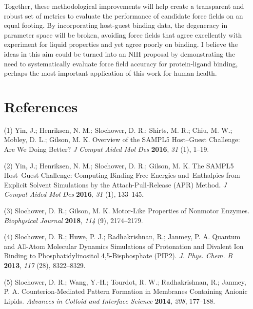 \documentclass[11pt,notitlepage]{article}
\begin{document}
Together, these methodological improvements will help create a
transparent and robust set of metrics to evaluate the performance of
candidate force fields on an equal footing. By incorporating host-guest
binding data, the degeneracy in parameter space will be broken, avoiding
force fields that agree excellently with experiment for liquid
properties and yet agree poorly on binding. I believe the ideas in this
aim could be turned into an NIH proposal by demonstrating the need to
systematically evaluate force field accuracy for protein-ligand binding,
perhaps the most important application of this work for human health.

\pagebreak
\setlength{\parskip}{0.1mm}

\hypertarget{references}{%
\section*{References}\label{references}}


\hypertarget{refs}{}
\leavevmode\hypertarget{ref-BGsUYQln}{}%
(1) Yin, J.; Henriksen, N. M.; Slochower, D. R.; Shirts, M. R.; Chiu, M.
W.; Mobley, D. L.; Gilson, M. K. Overview of the SAMPL5 Host--Guest
Challenge: Are We Doing Better? \emph{J Comput Aided Mol Des}
\textbf{2016}, \emph{31} (1), 1--19.

\leavevmode\hypertarget{ref-uzHaEv9Z}{}%
(2) Yin, J.; Henriksen, N. M.; Slochower, D. R.; Gilson, M. K. The
SAMPL5 Host--Guest Challenge: Computing Binding Free Energies
and~Enthalpies from Explicit Solvent Simulations by the
Attach-Pull-Release (APR) Method. \emph{J Comput Aided Mol Des}
\textbf{2016}, \emph{31} (1), 133--145.

\leavevmode\hypertarget{ref-1BfYw0gk2}{}%
(3) Slochower, D. R.; Gilson, M. K. Motor-Like Properties of Nonmotor
Enzymes. \emph{Biophysical Journal} \textbf{2018}, \emph{114} (9),
2174--2179.

\leavevmode\hypertarget{ref-1G0A01ZNq}{}%
(4) Slochower, D. R.; Huwe, P. J.; Radhakrishnan, R.; Janmey, P. A.
Quantum and All-Atom Molecular Dynamics Simulations of Protonation and
Divalent Ion Binding to Phosphatidylinositol 4,5-Bisphosphate (PIP2).
\emph{J. Phys. Chem. B} \textbf{2013}, \emph{117} (28), 8322--8329.

\leavevmode\hypertarget{ref-SdO7fVnR}{}%
(5) Slochower, D. R.; Wang, Y.-H.; Tourdot, R. W.; Radhakrishnan, R.;
Janmey, P. A. Counterion-Mediated Pattern Formation in Membranes
Containing Anionic Lipids. \emph{Advances in Colloid and Interface
Science} \textbf{2014}, \emph{208}, 177--188.
\end{document}
